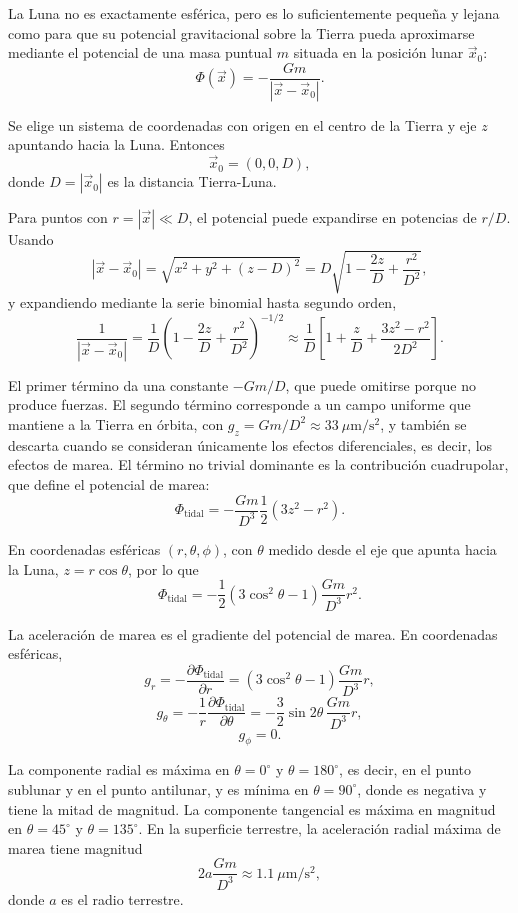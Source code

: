 La Luna no es exactamente esférica, pero es lo suficientemente pequeña y lejana como para que su potencial gravitacional sobre la Tierra pueda aproximarse mediante el potencial de una masa puntual $m$ situada en la posición lunar $\vec{x}_0$:
$$ \Phi(\vec{x}) = -\frac{Gm}{|\vec{x}-\vec{x}_0|}. $$

Se elige un sistema de coordenadas con origen en el centro de la Tierra y eje $z$ apuntando hacia la Luna. Entonces
$$ \vec{x}_0 = (0,0,D), $$
donde $D = |\vec{x}_0|$ es la distancia Tierra-Luna.

Para puntos con $r = |\vec{x}| \ll D$, el potencial puede expandirse en potencias de $r/D$. Usando
$$ |\vec{x}-\vec{x}_0| = \sqrt{x^2 + y^2 + (z-D)^2} = D\sqrt{1 - \frac{2z}{D} + \frac{r^2}{D^2}}, $$
y expandiendo mediante la serie binomial hasta segundo orden,
$$ \frac{1}{|\vec{x}-\vec{x}_0|} = \frac{1}{D}\left(1 - \frac{2z}{D} + \frac{r^2}{D^2}\right)^{-1/2} \approx \frac{1}{D}\left[1 + \frac{z}{D} + \frac{3z^2 - r^2}{2D^2}\right]. $$

El primer término da una constante $-Gm/D$, que puede omitirse porque no produce fuerzas. El segundo término corresponde a un campo uniforme que mantiene a la Tierra en órbita, con $g_z = Gm/D^2 \approx 33\ \mu\mathrm{m/s^2}$, y también se descarta cuando se consideran únicamente los efectos diferenciales, es decir, los efectos de marea. El término no trivial dominante es la contribución cuadrupolar, que define el potencial de marea:
$$ \Phi_{\mathrm{tidal}} = -\frac{Gm}{D^3}\frac{1}{2}(3z^2 - r^2). $$

En coordenadas esféricas $(r,\theta,\phi)$, con $\theta$ medido desde el eje que apunta hacia la Luna, $z = r\cos\theta$, por lo que
$$ \Phi_{\mathrm{tidal}} = -\frac{1}{2}(3\cos^2\theta - 1)\frac{Gm}{D^3}r^2. $$

La aceleración de marea es el gradiente del potencial de marea. En coordenadas esféricas,
$$ g_r = -\frac{\partial \Phi_{\mathrm{tidal}}}{\partial r} = (3\cos^2\theta - 1)\frac{Gm}{D^3}r, $$
$$ g_\theta = -\frac{1}{r}\frac{\partial \Phi_{\mathrm{tidal}}}{\partial \theta} = -\frac{3}{2}\sin 2\theta\,\frac{Gm}{D^3}r, $$
$$ g_\phi = 0. $$

La componente radial es máxima en $\theta = 0^\circ$ y $\theta = 180^\circ$, es decir, en el punto sublunar y en el punto antilunar, y es mínima en $\theta = 90^\circ$, donde es negativa y tiene la mitad de magnitud. La componente tangencial es máxima en magnitud en $\theta = 45^\circ$ y $\theta = 135^\circ$. En la superficie terrestre, la aceleración radial máxima de marea tiene magnitud
$$ 2a\frac{Gm}{D^3} \approx 1.1\ \mu\mathrm{m/s^2}, $$
donde $a$ es el radio terrestre.

